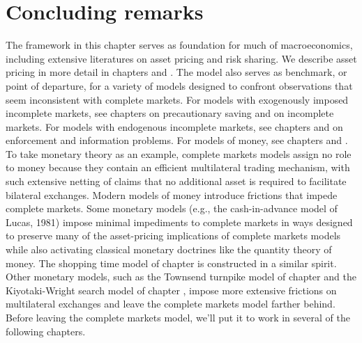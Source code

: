 \section{Concluding remarks}
  The  framework in this chapter serves as foundation for much of  macroeconomics, including
extensive literatures on asset pricing and risk sharing.
We describe  asset pricing in more
detail in chapters  and .
The model also serves as benchmark, or point of departure,
for a variety of models designed to confront observations
that seem inconsistent with complete markets. For models   with exogenously imposed   incomplete markets,
see chapters  on precautionary saving and
 on  incomplete markets. For
models with endogenous incomplete markets,
see chapters  and  on
enforcement and information problems. For
models of money, see
chapters  and .
 To take monetary theory as an example, complete
markets models assign no role to  money because they
contain an efficient multilateral trading mechanism, with such
extensive  netting of claims that no additional asset is
required to facilitate bilateral exchanges.   Modern models of
money introduce frictions that impede complete markets.     Some
monetary models (e.g., the cash-in-advance model of Lucas, 1981)
impose minimal impediments to complete markets in ways designed to  preserve many
of the asset-pricing implications of complete markets models while
also activating classical monetary doctrines like the quantity
theory of money. The shopping time model of chapter
 is constructed in a similar
spirit.  Other monetary  models, such as the Townsend turnpike
model of chapter  and the Kiyotaki-Wright search
model of chapter , impose more  extensive frictions
on multilateral exchanges and leave the complete markets model
farther behind.
  Before leaving the complete markets model, we'll put it
to work in several of the following chapters.
   

